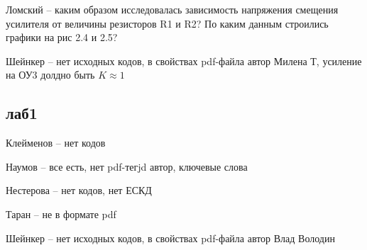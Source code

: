 \documentclass[a4paper,11pt]{article}
\begin{document}

Ломский -- каким образом исследовалась зависимость напряжения смещения усилителя от величины резисторов R1 и R2?
 По каким данным  строились графики на рис 2.4 и 2.5?

Шейнкер -- нет исходных кодов, в свойствах pdf-файла автор Милена Т, усиление на ОУ3 долдно быть $K \approx 1$

\newpage
\subsection*{лаб1}
Клейменов -- нет кодов

Наумов -- все есть, нет pdf-тегjd автор, ключевые слова

Нестерова -- нет кодов, нет ЕСКД

Таран -- не в формате pdf

Шейнкер -- нет исходных кодов, в свойствах pdf-файла автор Влад Володин 
\end{document}
